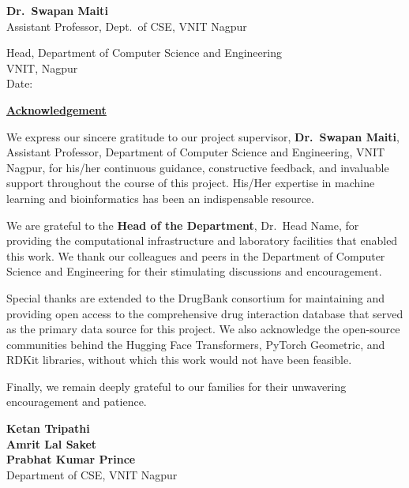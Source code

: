 \documentclass[12pt,a4paper,oneside]{report}
\begin{document}
\vspace{2cm}
\begin{flushright}
\textbf{Dr.\ Swapan Maiti}\\
Assistant Professor, Dept.\ of CSE, VNIT Nagpur
\end{flushright}

\vspace{1cm}
\noindent Head, Department of Computer Science and Engineering\\
VNIT, Nagpur\\[0.3cm]
Date: \underline{\hspace{4cm}}

\newpage
\thispagestyle{empty}
\begin{center}
{\Large\bfseries\underline{Acknowledgement}}
\end{center}
\vspace{1cm}

We express our sincere gratitude to our project supervisor, \textbf{Dr.\ Swapan Maiti},
Assistant Professor, Department of Computer Science and Engineering, VNIT Nagpur, for
his/her continuous guidance, constructive feedback, and invaluable support throughout the
course of this project. His/Her expertise in machine learning and bioinformatics has been
an indispensable resource.

We are grateful to the \textbf{Head of the Department}, Dr.\ Head Name, for providing
the computational infrastructure and laboratory facilities that enabled this work. We thank
our colleagues and peers in the Department of Computer Science and Engineering for their
stimulating discussions and encouragement.

Special thanks are extended to the DrugBank consortium for maintaining and providing open
access to the comprehensive drug interaction database that served as the primary data source
for this project. We also acknowledge the open-source communities behind the Hugging Face
Transformers, PyTorch Geometric, and RDKit libraries, without which this work would not have
been feasible.

Finally, we remain deeply grateful to our families for their unwavering encouragement and
patience.

\vspace{2cm}
\begin{flushright}
\textbf{Ketan Tripathi}\\
\textbf{Amrit Lal Saket}\\
\textbf{Prabhat Kumar Prince}\\
Department of CSE, VNIT Nagpur
\end{flushright}
\end{document}

